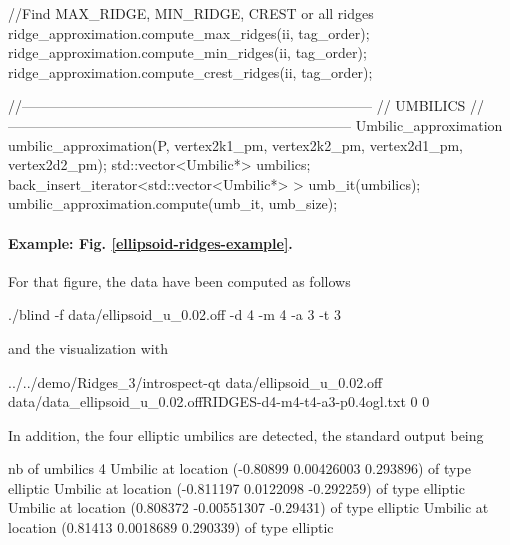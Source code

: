 \begin{ccExampleCode}
{  //Find MAX_RIDGE, MIN_RIDGE, CREST or all ridges
  ridge_approximation.compute_max_ridges(ii, tag_order);  
  ridge_approximation.compute_min_ridges(ii, tag_order);  
  ridge_approximation.compute_crest_ridges(ii, tag_order);  

  //---------------------------------------------------------------------------
  // UMBILICS
  //--------------------------------------------------------------------------
  Umbilic_approximation umbilic_approximation(P, 
					      vertex2k1_pm, vertex2k2_pm,
					      vertex2d1_pm, vertex2d2_pm);
  std::vector<Umbilic*> umbilics;
  back_insert_iterator<std::vector<Umbilic*> > umb_it(umbilics);
  umbilic_approximation.compute(umb_it, umb_size);
 }
\end{ccExampleCode}

\paragraph{Example:  Fig. \ref{ellipsoid-ridges-example}.}
For that figure, the data have been computed as follows
\begin{ccExampleCode}
./blind -f data/ellipsoid_u_0.02.off -d 4 -m 4 -a 3 -t 3
\end{ccExampleCode}
and the visualization with 
\begin{ccExampleCode}
 ../../demo/Ridges_3/introspect-qt data/ellipsoid_u_0.02.off data/data_ellipsoid_u_0.02.offRIDGES-d4-m4-t4-a3-p0.4ogl.txt 0 0
\end{ccExampleCode} 
In addition, the four elliptic umbilics are detected, the standard output being
\begin{ccExampleCode}
nb of umbilics 4
Umbilic at location (-0.80899 0.00426003 0.293896) of type elliptic
Umbilic at location (-0.811197 0.0122098 -0.292259) of type elliptic
Umbilic at location (0.808372 -0.00551307 -0.29431) of type elliptic
Umbilic at location (0.81413 0.0018689 0.290339) of type elliptic
\end{ccExampleCode}



